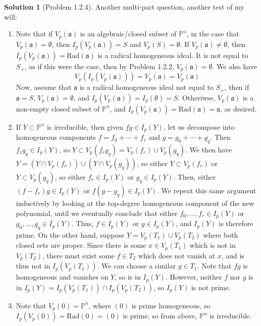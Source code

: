 \documentclass[aps,pra,showpacs,notitlepage,onecolumn,superscriptaddress,nofootinbib]{revtex4-1}
\theoremstyle{definition}
\newtheorem{solution}{Solution}[section]
\begin{document}
\begin{solution}[Problem 1.2.4]
  Another multi-part question, another test of my will:
  \begin{enumerate}
    \item Note that if $V_p(\mathfrak{a})$ is an algebraic/closed subset of $\mathbb{P}^n$, in the case that $V_p(\mathfrak{a}) = \emptyset$, then $I_p(V_p(\mathfrak{a})) = S$ and $V_p(S) = \emptyset$.
      If $V_p(\mathfrak{a}) \neq \emptyset$, then $I_p(V_p(\mathfrak{a})) = \text{Rad}(\mathfrak{a})$ is a radical homogeneous ideal. It is not equal to $S_{+}$, as if this were the case, then by Problem 1.2.2, $V_p(\mathfrak{a}) = \emptyset$.
      We also have
      \begin{equation}
      V_p(I_p(V_p(\mathfrak{a}))) = \overline{V_p(\mathfrak{a})} = V_p(\mathfrak{a})
      \end{equation}
      Now, assume that $\mathfrak{a}$ is a radical homogeneous ideal not equal to $S_{+}$, then if $\mathfrak{a} = S$, $V_p(\mathfrak{a}) = \emptyset$, and $I_p(V_p(\mathfrak{a})) = I_p(\emptyset) = S$. Otheriwse, $V_p(\mathfrak{a})$ is a
      non-empty closed subset of $\mathbb{P}^n$, and $I_p(V_p(\mathfrak{a})) = \text{Rad}(\mathfrak{a}) = \mathfrak{a}$, as desired.
      \item If $Y \subset \mathbb{P}^n$ is irreducible, then given $fg \in I_p(Y)$, let us decompose into homogeneous components $f = f_0 + \cdots + f_r$ and $g = g_0 + \cdots + g_q$. Then $f_r g_q \in I_p(Y)$, so $Y \subset V_p(f_r g_q) = V_p(f_r) \cup V_p(g_q)$.
        We then have $Y = (Y \cap V_p(f_r)) \cup (Y \cap V_p(g_q))$, so either $Y \subset V_p(f_r)$ or $Y \subset V_p(g_q)$, so either $f_r \in I_p(Y)$ or $g_q \in I_p(Y)$. Then, either $(f - f_r) g \in I_p(Y)$ or $f (g - g_q) \in I_p(Y)$. We repeat
        this same argument inductively by looking at the top-degree homogeneous component of the new polynomial, until we eventually conclude that either $f_0, \dots, f_r \in I_p(Y)$ or $g_0, \dots, g_q \in I_p(Y)$. Thus, $f \in I_p(Y)$ or $g \in I_p(Y)$,
        and $I_p(Y)$ is therefore prime.
        On the other hand, suppose $Y = V_p(T_1) \cup V_p(T_2)$ where both closed sets are proper. Since there is some $x \in V_p(T_1)$ which is not in $V_p(T_2)$,
        there must exist some $f \in T_2$ which does not vanish at $x$, and is thus not in $I_p(V_p(T_1))$. We can choose a similar $g \in T_1$. Note that $fg$ is homogeneous
        and vanishes on $Y$, so is in $I_p(Y)$. However, neither $f$ nor $g$ is in $I_p(Y) = I_p(V_p(T_1)) \cap I_p(V_p(T_2))$, so $I_p(Y)$ is not prime.
        \item Note that $V_p(0) = \mathbb{P}^n$, where $(0)$ is prime homogeneous, so $I_p(V_p(0)) = \text{Rad}(0) = (0)$ is prime, so from above, $\mathbb{P}^n$ is irreducible.
    \end{enumerate}
  \end{solution}
\end{document}
